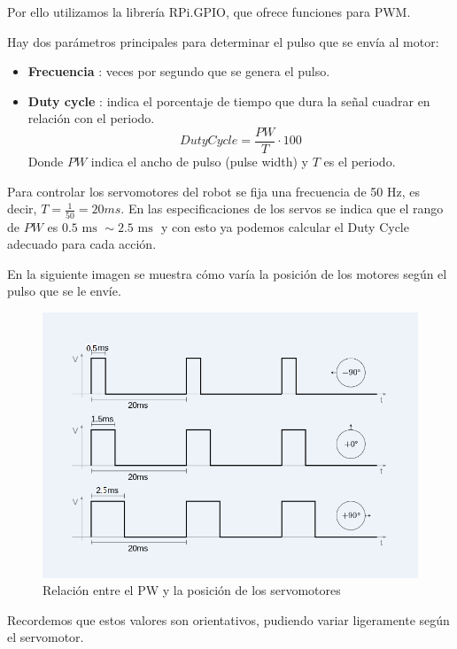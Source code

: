 \documentclass[twoside, 11pt]{epstfg}
\begin{document}
Por ello utilizamos la librería RPi.GPIO, que ofrece funciones para PWM.

Hay dos parámetros principales para determinar el pulso que se envía al motor:
\begin{itemize}
	\item \textbf{Frecuencia} : veces por segundo que se genera el pulso.
	\item \textbf{Duty cycle} : indica el porcentaje de tiempo que dura la señal cuadrar en relación con el periodo.
	$$DutyCycle = \frac{PW}{T}\cdot 100$$
	Donde $PW$ indica el ancho de pulso (pulse width) y $T$ es el periodo.
	
\end{itemize}

Para controlar los servomotores del robot se fija una frecuencia de 50 Hz, es decir, $T = \frac{1}{50} = 20 ms$.
En las especificaciones de los servos se indica que el rango de $PW$ es $0.5 \text{ ms } \sim 2.5\text{ ms }$ y con esto ya podemos calcular el Duty Cycle adecuado para cada acción.

En la siguiente imagen se muestra cómo varía la posición de los motores según el pulso que se le envíe.

\begin{figure}[h!]
	\centerline{
		\mbox{\includegraphics[width=.80\textwidth]{images/PWMServos.png}}
	}
	\caption{Relación entre el PW y la posición de los servomotores}
	\label{figPWM}
\end{figure}

Recordemos que estos valores son orientativos, pudiendo variar ligeramente según el servomotor.
\end{document}
